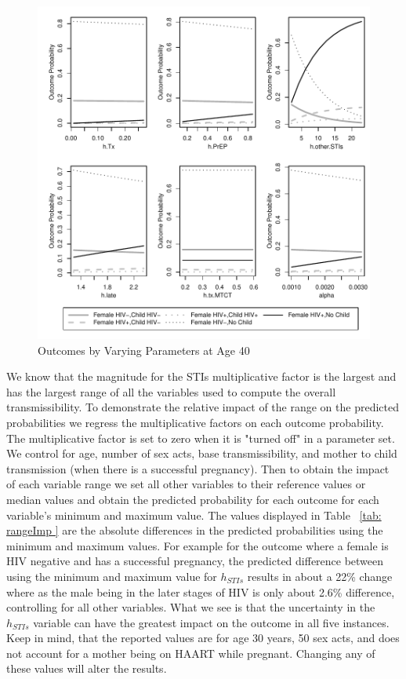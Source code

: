 \documentclass[11pt]{nih_mod}
\begin{document}
\begin{figure}[!h]
  \begin{center}
    \includegraphics[width=5in]{figures/OnlyVaryParam_Age40_06Sept2012.pdf}
  \end{center}
  \caption{Outcomes by Varying Parameters at Age 40}
  \label{Fig:Vary40}
\end{figure}

We know that the magnitude for the STIs multiplicative factor is the largest and has the largest range of all the variables used to compute the overall transmissibility.  To demonstrate the relative impact of the range on the predicted probabilities we regress the multiplicative factors on each outcome probability.  The multiplicative factor is set to zero when it is "turned off" in a parameter set.  We control for age, number of sex acts, base transmissibility, and mother to child transmission (when there is a successful pregnancy).  Then to obtain the impact of each variable range we set all other variables to their reference values or median values and obtain the predicted probability for each outcome for each variable's minimum and maximum value.  The values displayed in Table ~\ref{tab: rangeImp } are the absolute differences in the predicted probabilities using the minimum and maximum values.  For example for the outcome where a female is HIV negative and has a successful pregnancy, the predicted difference between using the minimum and maximum value for $h_{STIs}$ results in about a 22\% change where as the male being in the later stages of HIV is only about 2.6\% difference, controlling for all other variables.   What we see is that the uncertainty in the $h_{STIs}$ variable can have the greatest impact on the outcome in all five instances.  Keep in mind, that the reported values are for age 30 years, 50 sex acts, and does not account for a mother being on HAART while pregnant.  Changing any of these values will alter the results.
\end{document}
